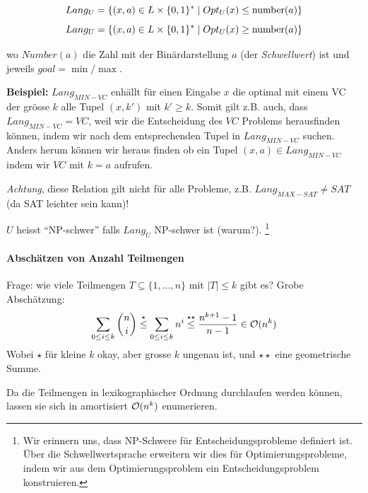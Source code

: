 \[ Lang_U = \{ (x, a) \in L \times \lbrace 0, 1 \rbrace^* \; | \; Opt_U(x) \leq \text{number}(a) \} \]
\[ Lang_U = \{ (x, a) \in L \times \lbrace 0, 1 \rbrace^* \; | \; Opt_U(x) \geq \text{number}(a) \} \]

wo $Number(a)$ die Zahl mit der Binärdarstellung $a$ (der \emph{Schwellwert}) ist und jeweils $goal = \min/\max$. 

\textbf{Beispiel:} $Lang_{MIN-VC}$ enhällt für einen Eingabe $x$ die optimal mit einem VC der grösse $k$ alle Tupel $(x, k')$ mit $k' \geq k$. Somit gilt z.B. auch, dass $Lang_{MIN-VC} = VC$, weil wir die Entscheidung des $VC$ Problems herausfinden können, indem wir nach dem entsprechenden Tupel in $Lang_{MIN-VC}$ suchen. Anders herum können wir heraus finden ob ein Tupel $(x, a) \in Lang_{MIN-VC}$ indem wir $VC$ mit $k = a$ aufrufen.

\emph{Achtung}, diese Relation gilt nicht für alle Probleme, z.B. $Lang_{MAX-SAT} \neq SAT$ (da SAT leichter sein kann)!

$U$ heisst ``NP-schwer'' falls $Lang_U$ NP-schwer ist (warum?).%
\footnote{Wir erinnern uns, dass NP-Schwere für Entscheidungsprobleme definiert ist.
Über die Schwellwertsprache erweitern wir dies für Optimierungsprobleme, indem wir aus dem Optimierungsproblem ein Entscheidungsproblem konstruieren.}

\paragraph{Abschätzen von Anzahl Teilmengen}
Frage: wie viele Teilmengen $T \subseteq \{1, \dots, n\}$ mit $|T| \leq k$ gibt es?
Grobe Abschätzung:
$$ \sum_{0 \leq i \leq k} \binom{n}{i}
\overset{\star}{\leq} \sum_{0 \leq i \leq k} n^i
\overset{\star\star}{\leq} \frac{n^{k+1} - 1}{n-1} \in \mathcal{O}(n^k) $$
Wobei $\star$ für kleine $k$ okay, aber grosse $k$ ungenau ist, und $\star\star$ eine geometrische Summe.

Da die Teilmengen in lexikographischer Ordnung durchlaufen werden können, lassen sie sich in amortisiert
$\mathcal{O}(n^k)$ enumerieren.
